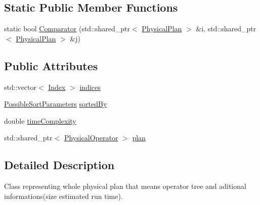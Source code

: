 \subsection*{Static Public Member Functions}
\begin{DoxyCompactItemize}
\item 
static bool \hyperlink{classrafe_1_1_physical_plan_acde8212fd29787b0fef4db7a080f70d3}{Comparator} (std\+::shared\+\_\+ptr$<$ \hyperlink{classrafe_1_1_physical_plan}{Physical\+Plan} $>$ \&i, std\+::shared\+\_\+ptr$<$ \hyperlink{classrafe_1_1_physical_plan}{Physical\+Plan} $>$ \&j)
\end{DoxyCompactItemize}
\subsection*{Public Attributes}
\begin{DoxyCompactItemize}
\item 
std\+::vector$<$ \hyperlink{classrafe_1_1_index}{Index} $>$ \hyperlink{classrafe_1_1_physical_plan_a612093270ee90c36a303533cf3ea4f48}{indices}
\item 
\hyperlink{classrafe_1_1_possible_sort_parameters}{Possible\+Sort\+Parameters} \hyperlink{classrafe_1_1_physical_plan_ada9f8409dc126ccc378c91a507e83854}{sorted\+By}
\item 
double \hyperlink{classrafe_1_1_physical_plan_a1f5748b98d9ae211fc653ad0de0fe2a2}{time\+Complexity}
\item 
std\+::shared\+\_\+ptr$<$ \hyperlink{classrafe_1_1_physical_operator}{Physical\+Operator} $>$ \hyperlink{classrafe_1_1_physical_plan_ac90f368fe33c419642571aa4573856c1}{plan}
\end{DoxyCompactItemize}


\subsection{Detailed Description}
Class representing whole physical plan that means operator tree and aditional informations(size estimated run time). 

